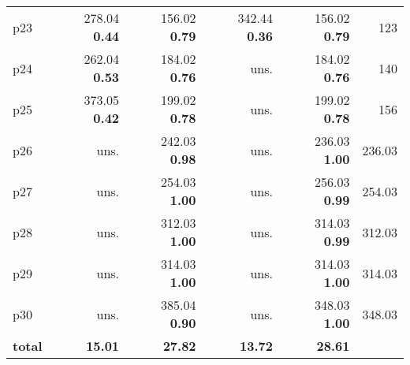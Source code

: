 \begin{tabular}{lrrrrr}
\multicolumn{1}{l|}{p23} & {\footnotesize 278.04} \textbf{0.44} & {\footnotesize 156.02} \textbf{0.79} & {\footnotesize 342.44} \textbf{0.36} & {\footnotesize 156.02} \textbf{0.79} & \multicolumn{1}{|r}{123}\\
\multicolumn{1}{l|}{p24} & {\footnotesize 262.04} \textbf{0.53} & {\footnotesize 184.02} \textbf{0.76} & uns. & {\footnotesize 184.02} \textbf{0.76} & \multicolumn{1}{|r}{140}\\
\multicolumn{1}{l|}{p25} & {\footnotesize 373.05} \textbf{0.42} & {\footnotesize 199.02} \textbf{0.78} & uns. & {\footnotesize 199.02} \textbf{0.78} & \multicolumn{1}{|r}{156}\\
\multicolumn{1}{l|}{p26} & uns. & {\footnotesize 242.03} \textbf{0.98} & uns. & {\footnotesize 236.03} \textbf{1.00} & \multicolumn{1}{|r}{236.03}\\
\multicolumn{1}{l|}{p27} & uns. & {\footnotesize 254.03} \textbf{1.00} & uns. & {\footnotesize 256.03} \textbf{0.99} & \multicolumn{1}{|r}{254.03}\\
\multicolumn{1}{l|}{p28} & uns. & {\footnotesize 312.03} \textbf{1.00} & uns. & {\footnotesize 314.03} \textbf{0.99} & \multicolumn{1}{|r}{312.03}\\
\multicolumn{1}{l|}{p29} & uns. & {\footnotesize 314.03} \textbf{1.00} & uns. & {\footnotesize 314.03} \textbf{1.00} & \multicolumn{1}{|r}{314.03}\\
\multicolumn{1}{l|}{p30} & uns. & {\footnotesize 385.04} \textbf{0.90} & uns. & {\footnotesize 348.03} \textbf{1.00} & \multicolumn{1}{|r}{348.03}\\
\midrule
\textbf{total} & \textbf{15.01} & \textbf{27.82} & \textbf{13.72} & \textbf{28.61} & \\
\bottomrule
\end{tabular}

